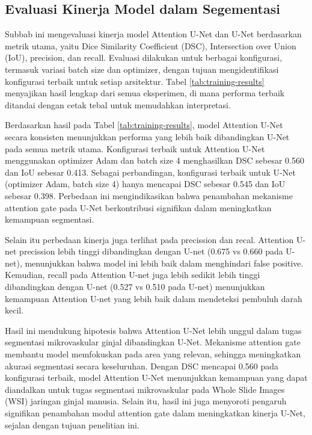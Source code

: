 \subsection{Evaluasi Kinerja Model dalam Segementasi}

\noindent Subbab ini mengevaluasi kinerja model Attention U-Net dan U-Net berdasarkan metrik utama, yaitu Dice Similarity Coefficient (DSC), Intersection over Union (IoU), precision, dan recall. Evaluasi dilakukan untuk berbagai konfigurasi, termasuk variasi batch size dan optimizer, dengan tujuan mengidentifikasi konfigurasi terbaik untuk setiap arsitektur. Tabel \ref{tab:training-results} menyajikan hasil lengkap dari semua eksperimen, di mana performa terbaik ditandai dengan cetak tebal untuk memudahkan interpretasi.

\noindent Berdasarkan hasil pada Tabel \ref{tab:training-results}, model Attention U-Net secara konsisten menunjukkan performa yang lebih baik dibandingkan U-Net pada semua metrik utama. Konfigurasi terbaik untuk Attention U-Net menggunakan optimizer Adam dan batch size 4 menghasilkan DSC sebesar 0.560 dan IoU sebesar 0.413. Sebagai perbandingan, konfigurasi terbaik untuk U-Net (optimizer Adam, batch size 4) hanya mencapai DSC sebesar 0.545 dan IoU sebesar 0.398. Perbedaan ini mengindikasikan bahwa penambahan mekanisme attention gate pada U-Net berkontribusi signifikan dalam meningkatkan kemampuan segmentasi.

\noindent Selain itu perbedaan kinerja juga terlihat pada precission dan recal. Attention U-net precission lebih tinggi dibandingkan dengan U-net (0.675 vs 0.660 pada U-net), menunjukkan bahwa model ini lebih baik dalam menghindari false positive. Kemudian, recall pada Attention U-net juga lebih sedikit lebih tinggi dibandingkan dengan U-net (0.527 vs 0.510 pada U-net) menunjukkan kemampuan Attention U-net yang lebih baik dalam mendeteksi pembuluh darah kecil.

\noindent Hasil ini mendukung hipotesis bahwa Attention U-Net lebih unggul dalam tugas segmentasi mikrovaskular ginjal dibandingkan U-Net. Mekanisme attention gate membantu model memfokuskan pada area yang relevan, sehingga meningkatkan akurasi segmentasi secara keseluruhan. Dengan DSC mencapai 0.560 pada konfigurasi terbaik, model Attention U-Net menunjukkan kemampuan yang dapat diandalkan untuk tugas segmentasi mikrovaskular pada Whole Slide Images (WSI) jaringan ginjal manusia. Selain itu, hasil ini juga menyoroti pengaruh signifikan penambahan modul attention gate dalam meningkatkan kinerja U-Net, sejalan dengan tujuan penelitian ini.



